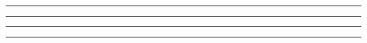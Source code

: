 \begin{problem}{9.5}

\end{problem}
\begin{solution}

\end{solution}

\noindent\rule{7in}{1.5pt}


\begin{problem}{9.6}

\end{problem}
\begin{solution}

\end{solution}

\noindent\rule{7in}{1.5pt}


\begin{problem}{9.7}

\end{problem}
\begin{solution}

\end{solution}

\noindent\rule{7in}{1.5pt}


\begin{problem}{9.8}

\end{problem}
\begin{solution}

\end{solution}

\noindent\rule{7in}{1.5pt}


\begin{problem}{9.9}

\end{problem}
\begin{solution}

\end{solution}

